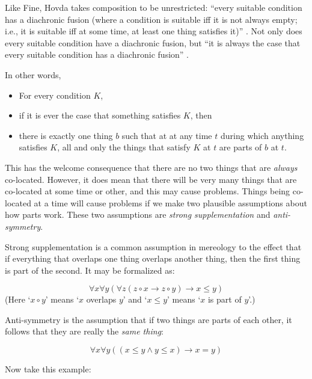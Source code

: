 \documentclass[11pt]{article}
\begin{document}
\begin{spacing}{1.5}
Like Fine, Hovda takes composition to be unrestricted: ``every
suitable condition has a diachronic fusion (where a condition is
suitable iff it is not always empty; i.e., it is suitable iff at some
time, at least one thing satisfies it)'' \citeyearpar[14]{hovda2011}.
Not only does every suitable condition have a diachronic fusion, but
``it is always the case that every suitable condition has a diachronic
fusion'' \citeyearpar[16]{hovda2011}.

In other words,

\begin{itemize}
  \item For every condition $K$,
  \item if it is ever the case that something satisfies $K$, then
  \item there is exactly one thing $b$ such that at at any time $t$
    during which anything satisfies $K$, all and only the things that
    satisfy $K$ at $t$ are parts of $b$ at $t$.
\end{itemize}

This has the welcome consequence that there are no two things that are
{\em always} co-located.  However, it does mean that there will be
very many things that are co-located at some time or other, and this
may cause problems.  Things being co-located at a time will cause
problems if we make two plausible assumptions about how parts work.
These two assumptions are {\em strong supplementation} and {\em
  anti-symmetry}.

Strong supplementation is a common assumption in mereology to the
effect that if everything that overlaps one thing overlaps another
thing, then the first thing is part of the second.  It may be
formalized as:

\begin{displaymath}
\forall x \forall y ( \forall z ( z \circ x \rightarrow z \circ y )
\rightarrow x \leq y )
\end{displaymath}
(Here `$x \circ y$' means `$x$ overlaps $y$' and `$x \leq y$' means
`$x$ is part of $y$'.)

Anti-symmetry is the assumption that if two things are parts of each
other, it follows that they are really the {\em same thing}:

\begin{displaymath}
\forall x \forall y ( ( x \leq y \wedge y \leq x ) \rightarrow x = y )
\end{displaymath}

Now take this example:


\end{spacing}
\end{document}
